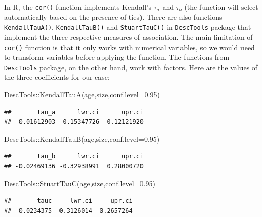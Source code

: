 \documentclass[
]{book}
\newenvironment{Shaded}{\begin{snugshade}}{\end{snugshade}}
\newcommand{\AttributeTok}[1]{\textcolor[rgb]{0.77,0.63,0.00}{#1}}
\newcommand{\FloatTok}[1]{\textcolor[rgb]{0.00,0.00,0.81}{#1}}
\newcommand{\FunctionTok}[1]{\textcolor[rgb]{0.00,0.00,0.00}{#1}}
\newcommand{\NormalTok}[1]{#1}
\newcommand{\SpecialCharTok}[1]{\textcolor[rgb]{0.00,0.00,0.00}{#1}}
\theoremstyle{definition}
\theoremstyle{definition}
\theoremstyle{definition}
\theoremstyle{definition}
\theoremstyle{remark}
\begin{document}
In R, the \texttt{cor()} function implements Kendall's \(\tau_a\) and \(\tau_b\) (the function will select automatically based on the presence of ties). There are also functions \texttt{KendallTauA()}, \texttt{KendallTauB()} and \texttt{StuartTauC()} in \texttt{DescTools} package that implement the three respective measures of association. The main limitation of \texttt{cor()} function is that it only works with numerical variables, so we would need to transform variables before applying the function. The functions from \texttt{DescTools} package, on the other hand, work with factors. Here are the values of the three coefficients for our case:

\begin{Shaded}
\begin{Highlighting}[]
\NormalTok{DescTools}\SpecialCharTok{::}\FunctionTok{KendallTauA}\NormalTok{(age,size,}\AttributeTok{conf.level=}\FloatTok{0.95}\NormalTok{)}
\end{Highlighting}
\end{Shaded}

\begin{verbatim}
##       tau_a      lwr.ci      upr.ci 
## -0.01612903 -0.15347726  0.12121920
\end{verbatim}

\begin{Shaded}
\begin{Highlighting}[]
\NormalTok{DescTools}\SpecialCharTok{::}\FunctionTok{KendallTauB}\NormalTok{(age,size,}\AttributeTok{conf.level=}\FloatTok{0.95}\NormalTok{)}
\end{Highlighting}
\end{Shaded}

\begin{verbatim}
##       tau_b      lwr.ci      upr.ci 
## -0.02469136 -0.32938991  0.28000720
\end{verbatim}

\begin{Shaded}
\begin{Highlighting}[]
\NormalTok{DescTools}\SpecialCharTok{::}\FunctionTok{StuartTauC}\NormalTok{(age,size,}\AttributeTok{conf.level=}\FloatTok{0.95}\NormalTok{)}
\end{Highlighting}
\end{Shaded}

\begin{verbatim}
##       tauc     lwr.ci     upr.ci 
## -0.0234375 -0.3126014  0.2657264
\end{verbatim}
\end{document}
